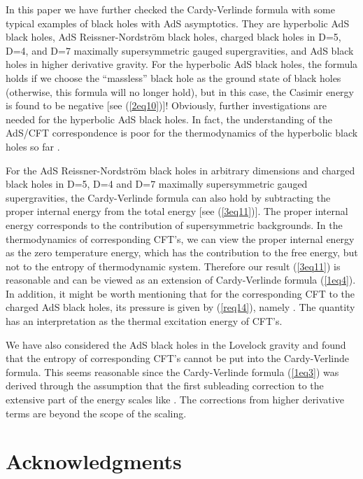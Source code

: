 \documentclass[a4paper,12pt]{article}
\begin{document}
In this paper we have further checked the Cardy-Verlinde formula with some
typical examples of black holes with AdS asymptotics. They are hyperbolic  
AdS black holes, AdS Reissner-Nordstr\"om black holes, charged black holes
in D=5, D=4, and D=7 maximally supersymmetric gauged supergravities, and 
AdS black holes in higher derivative gravity.  For the hyperbolic AdS black 
holes, the formula holds if we choose the ``massless'' black hole as the 
ground state of black holes (otherwise, this formula will no longer hold),
but in this case, the Casimir energy is found to be negative 
[see (\ref{2eq10})]!  Obviously, further investigations are needed for the
hyperbolic AdS black holes. In fact, the understanding of the AdS/CFT 
correspondence is poor  for the thermodynamics of the hyperbolic black 
holes so far \cite{Emp}.  


 For the AdS
Reissner-Nordstr\"om black holes in arbitrary dimensions and charged black 
holes in D=5, D=4 and D=7 maximally supersymmetric gauged supergravities, 
the Cardy-Verlinde formula can also hold by subtracting the proper internal
energy  from the total energy [see (\ref{3eq11})].  The proper internal energy
corresponds to the contribution of supersymmetric backgrounds. In the 
thermodynamics of corresponding CFT's, we can view the proper internal
energy as the zero temperature energy, which has the contribution to the 
free energy, but not to the entropy of thermodynamic system. Therefore our 
result (\ref{3eq11}) is reasonable and can be viewed as an extension of 
Cardy-Verlinde formula (\ref{1eq4}).  In addition, it might be worth 
mentioning that for the corresponding CFT to the charged AdS
black holes, its pressure is given by (\ref{req14}), namely \coordHE{}.
The quantity \coordHE{} has an interpretation as the thermal excitation
energy of CFT's.  

We have also considered  the AdS black holes in the Lovelock gravity and found
that the entropy of corresponding CFT's cannot be put into the Cardy-Verlinde
formula. This seems reasonable since the Cardy-Verlinde formula (\ref{1eq3})
was derived through the assumption that the first subleading correction
to the extensive part of the energy scales like \coordHE{}. The corrections from higher derivative terms
are beyond the scope of the scaling.   


\section*{Acknowledgments}
\end{document}
